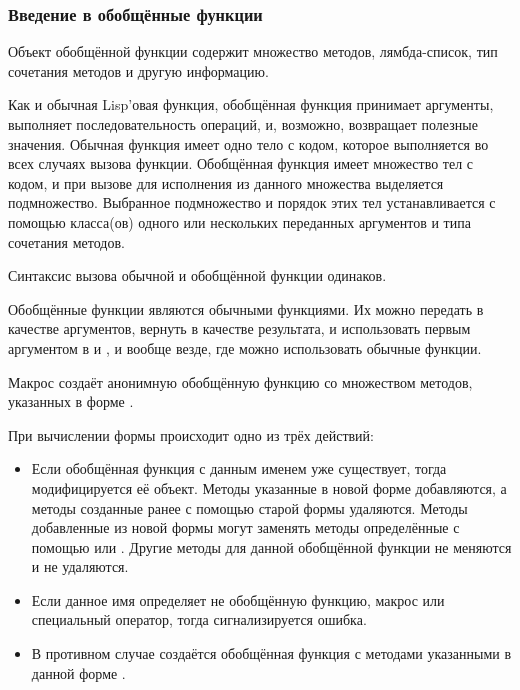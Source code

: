 \subsubsection{Введение в обобщённые функции}

Объект обобщённой функции содержит множество методов, лямбда-список, тип
сочетания методов и другую информацию.

Как и обычная Lisp'овая функция, обобщённая функция принимает аргументы,
выполняет последовательность операций, и, возможно, возвращает полезные значения.
Обычная функция имеет одно тело с кодом, которое выполняется во всех случаях
вызова функции. Обобщённая функция имеет множество тел с кодом, и при вызове для
исполнения из данного множества выделяется подмножество. Выбранное подмножество
и порядок этих тел устанавливается с помощью класса(ов) одного или
нескольких переданных аргументов и типа сочетания методов.

Синтаксис вызова обычной и обобщённой функции одинаков.

Обобщённые функции являются обычными функциями. Их можно передать в
качестве аргументов, вернуть в качестве результата, и использовать первым
аргументом в  и , и вообще везде, где можно использовать
обычные функции.

Макрос  создаёт анонимную обобщённую функцию со множеством
методов, указанных в форме .

При вычислении формы  происходит одно из трёх действий:

\begin{itemize}
\item Если обобщённая функция с данным именем уже существует, тогда
  модифицируется её объект. Методы указанные в новой форме 
  добавляются, а методы созданные ранее с помощью старой формы 
  удаляются. Методы добавленные из новой формы  могут заменять
  методы определённые с помощью  или . Другие
  методы для данной обобщённой функции не меняются и не удаляются.

\item Если данное имя определяет не обобщённую функцию, макрос или специальный
  оператор, тогда сигнализируется ошибка.

\item В противном случае создаётся обобщённая функция с методами указанными в
  данной форме .
\end{itemize}

